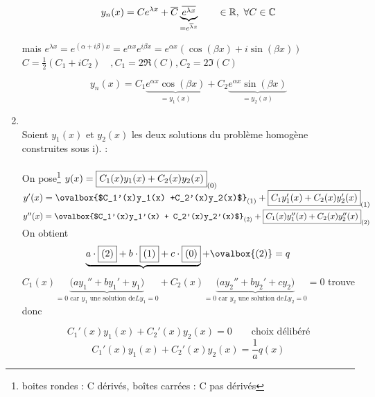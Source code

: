 \documentclass[12pt,a4paper]{article}
\begin{document}
\begin{enumerate}[label=\roman*)]
\begin{boite}
\begin{equation*}
			y_n(x) = Ce^{\lambda x} + \overline{C}\underbrace{\overline{e^{\lambda x}}}_{=e^{\overline{\lambda}x}} \qquad \in \mathbb{R}, \ \forall C \in \mathbb{C}
		\end{equation*}
	\end{boite}
	mais $e^{\lambda x} = e^{(\alpha + i\beta) x} = e^{\alpha x}e^{i\beta x} = e^{\alpha x}(\cos(\beta x) + i\sin(\beta x))$\\
	$C = \frac{1}{2}(C_1+iC_2) \quad ,C_1 = 2\Re(C), C_2 = 2\Im(C)$
	\begin{boite}
		\begin{equation*}
			y_n(x) = C_1\underbrace{e^{\alpha x}\cos(\beta x)}_{=y_1(x)} + C_2 \underbrace{e^{\alpha x}\sin(\beta x)}_{=y_2(x)}
		\end{equation*}
	\end{boite}
	\item {}\\
	Soient $y_1(x)$ et $y_2(x)$ les deux solutions du problème homogène construites sous i). :\\
	\\
	On pose\footnote{boites rondes : C dérivés, boîtes carrées : C pas dérivés} $y(x) =\text{\fbox{$C_1(x)y_1(x) +C_2(x) y_2(x)$}}_{(0)}$\\
	$y'(x) = \text{\ovalbox{$C_1'(x)y_1(x) +C_2'(x)y_2(x)$}}_{(1)} + \text{\fbox{$C_1y_1'(x) + C_2(x)y_2'(x)$}}_{(1)}$ \\
	$y''(x) = \text{\ovalbox{$C_1'(x)y_1'(x) + C_2'(x)y_2'(x)$}}_{(2)} + \text{\fbox{$C_1(x)y_1''(x) + C_2(x)y_2''(x)$}}_{(2)}$\\
	On obtient
	\begin{equation*}
		\underbrace{a\cdot\fbox{(2)} + b\cdot\fbox{(1)} + c\cdot\fbox{(0)}} + \ovalbox{(2)} = q
	\end{equation*}
	$C_1(x)\underbrace{\big(ay_1''+by_1'+y_1\big)}_{=0\text{ car $y_1$ une solution de} Ly_1 = 0} + C_2(x)\underbrace{\big(ay_2'' + by_2' + cy_2\big)}_{=0\text{ car $y_2$ une solution de} Ly_2= 0} = 0$
	 trouve donc
	\begin{boite}
		\begin{equation*}
			C_1'(x)y_1(x) + C_2'(x)y_2(x) = 0 \qquad \text{choix délibéré}
		\end{equation*}
		\begin{equation}
		C_1'(x)y_1(x) + C_2'(x)y_2(x) = \frac{1}{a}q(x)
		\label{solution methode variation des constantes}
		\end{equation}

\end{boite}
\end{enumerate}
\end{document}
